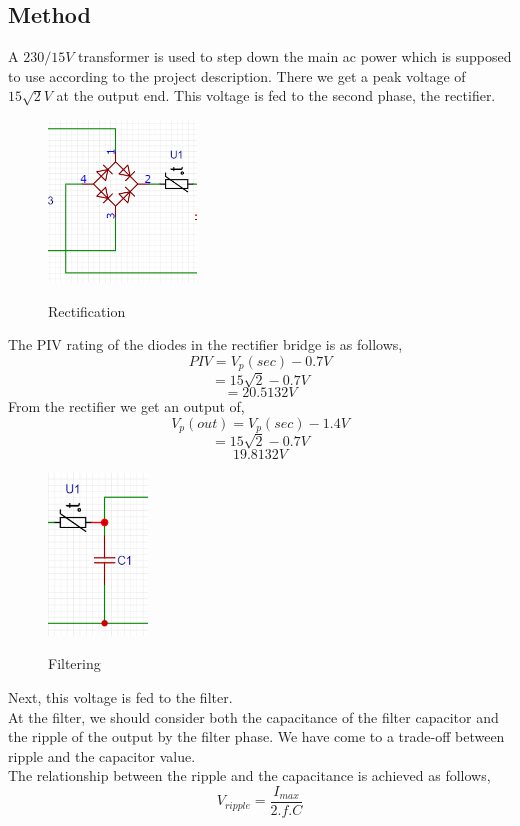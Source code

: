 \documentclass[11pt]{article}
\begin{document}
\begin{multicols}{2}
\section{Method}
A $230/15 V$ transformer is used to step down the main ac power which is supposed to use according to the project description. There we get a peak voltage of $15\sqrt{2}V$ at the output end. This voltage is fed to the second phase, the rectifier. 
\begin{figure}[H]
   \centering
   \includegraphics[height=1.7in]{rectification.png}\\
   \caption{Rectification}
\end{figure}
The PIV rating of the diodes in the rectifier bridge is as follows,\\
$$ PIV = V_p(sec) - 0.7V$$
$$=15\sqrt{2} - 0.7V$$
$$=20.5132V$$
From the rectifier we get an output of,\\
$$V_p(out) = V_p(sec) - 1.4V$$
$$ = 15\sqrt{2} - 0.7V$$
$$19.8132V$$
\begin{figure}[H]
   \centering
   \includegraphics[height=1.7in]{Filtering.png}\\
   \caption{Filtering}
\end{figure}
Next, this voltage is fed to the filter.\\
At the filter, we should consider both the capacitance of the filter capacitor and the ripple of the output by the filter phase. We have come to a trade-off between ripple and the capacitor value.\\
The relationship between the ripple and the capacitance is achieved as follows,\\
$$V_{ripple} = \frac{I_{max}}{2.f.C}$$

\end{multicols}
\end{document}
